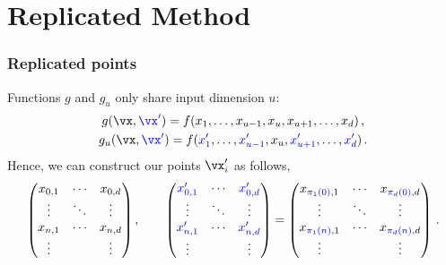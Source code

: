 \documentclass[11pt,compress]{beamer} %
\begin{document}
\section{Replicated Method}

\begin{frame}
\frametitle{Replicated points}
Functions $g$ and $g_u$ only share input dimension $u$:
\begin{gather*}
g(\vx,{\color{blue}\vx'})=f(x_1,\dots,x_{u-1},x_u,x_{u+1},\dots,x_d)\, ,\\
g_u(\vx,{\color{blue}\vx'})=f({\color{blue}x'_1},\dots,{\color{blue}x'_{u-1}},x_u,{\color{blue}x'_{u+1}},\dots,{\color{blue}x'_d})\, .
\end{gather*}
Hence, we can construct our points $\vx'_i$ as follows,
\begin{equation*}
\begin{pmatrix}
x_{0,1} & \cdots & x_{0,d} \\
\vdots & \ddots & \vdots \\
x_{n,1} & \cdots & x_{n,d} \\
\vdots &  & \vdots
\end{pmatrix},\qquad
\begin{pmatrix}
{\color{blue}x'_{0,1}} & \cdots & {\color{blue}x'_{0,d}} \\
\vdots & \ddots & \vdots \\
{\color{blue}x'_{n,1}} & \cdots & {\color{blue}x'_{n,d}} \\
\vdots &  & \vdots
\end{pmatrix}=
\begin{pmatrix}
x_{{\color{blue}\pi_1(0)},1} & \cdots & x_{{\color{blue}\pi_d(0)},d} \\
\vdots & \ddots & \vdots \\
x_{{\color{blue}\pi_1(n)},1} & \cdots & x_{{\color{blue}\pi_d(n)},d} \\
\vdots &  & \vdots \\
\end{pmatrix}\, .
\end{equation*}
\end{frame}
\end{document}
